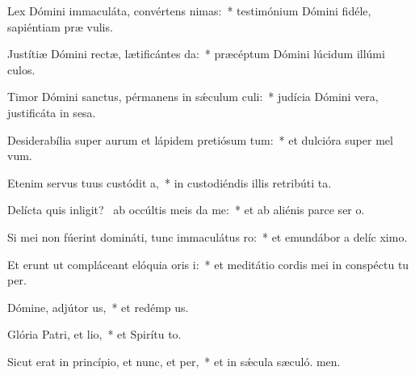 \item Lex Dómini immaculáta, convértens nimas:~* testimónium Dómini fidéle, sapiéntiam præ vulis.
\item Justítiæ Dómini rectæ, lætificántes da:~* præcéptum Dómini lúcidum illúmi culos.
\item Timor Dómini sanctus, pérmanens in sǽculum culi:~* judícia Dómini vera, justificáta in sesa.
\item Desiderabília super aurum et lápidem pretiósum tum:~* et dulcióra super mel  vum.
\item Etenim servus tuus custódit a,~* in custodiéndis illis retribúti ta.
\item Delícta quis inligit?~\pscross{} ab occúltis meis da me:~* et ab aliénis parce ser o.
\item Si mei non fúerint domináti, tunc immaculátus ro:~* et emundábor a delíc ximo.
\item Et erunt ut compláceant elóquia oris i:~* et meditátio cordis mei in conspéctu tu per.
\item Dómine, adjútor us,~* et redémp us.
\item Glória Patri, et lio,~* et Spirítu to.
\item Sicut erat in princípio, et nunc, et per,~* et in sǽcula sæculó. men.
